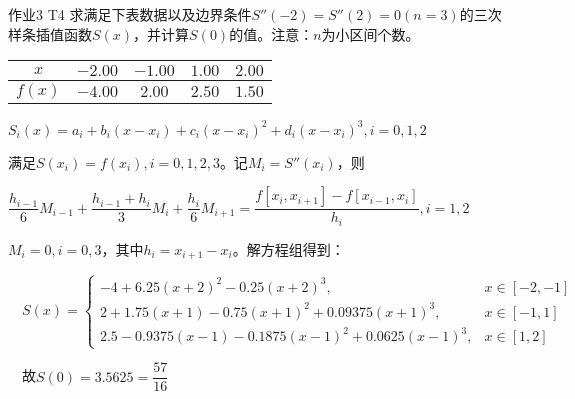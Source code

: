 \documentclass[10pt]{beamer}
\begin{document}
    \begin{frame}{作业3 T4}
        求满足下表数据以及边界条件$S''(-2)=S''(2)=0(n=3)$的三次样条插值函数$S(x)$，并计算$S(0)$的值。注意：$n$为小区间个数。
        \begin{table}[H]
            \begin{center}
                \begin{tabular}{|c|c|c|c|c|}
                \hline
                $x$ & $-2.00$ & $-1.00$ & $1.00$ & $2.00$ \\
                \hline
                $f(x)$ & $-4.00$ & $2.00$ & $2.50$ & $1.50$ \\
                \hline
                \end{tabular}
            \end{center}
        \end{table}

        \pause $S_i(x)=a_i+b_i(x-x_i)+c_i(x-x_i)^2+d_i(x-x_i)^3,i=0,1,2$

        \pause 满足$S(x_i)=f(x_i),i=0,1,2,3$。记$M_i=S''(x_i)$，则

        \pause $\dfrac{h_{i-1}}{6}M_{i-1}+\dfrac{h_{i-1}+h_i}{3}M_i+\dfrac{h_i}{6}M_{i+1}=\dfrac{f[x_i,x_{i+1}]-f[x_{i-1},x_i]}{h_i},i=1,2$

        \pause $M_i=0,i=0,3$，其中$h_i=x_{i+1}-x_i$。解方程组得到：

        \pause $\quad S(x)=\begin{cases}-4+6.25(x+2)^2-0.25(x+2)^3,&x\in[-2,-1]\\2+1.75(x+1)-0.75(x+1)^2+0.09375(x+1)^3,&x\in[-1,1]\\2.5-0.9375(x-1)-0.1875(x-1)^2+0.0625(x-1)^3,&x\in[1,2]\end{cases}$

        \pause $\quad$故$S(0)=3.5625=\dfrac{57}{16}$
    \end{frame}
\end{document}
